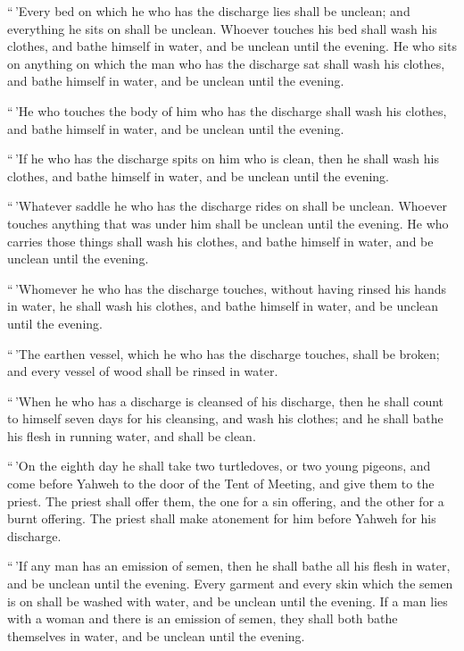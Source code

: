  ``\,'Every bed on which he who has the discharge lies
shall be unclean; and everything he sits on shall be unclean.
 Whoever touches his bed shall wash his clothes, and bathe
himself in water, and be unclean until the evening.  He
who sits on anything on which the man who has the discharge sat shall
wash his clothes, and bathe himself in water, and be unclean until the
evening.

 ``\,'He who touches the body of him who has the discharge
shall wash his clothes, and bathe himself in water, and be unclean until
the evening.

 ``\,'If he who has the discharge spits on him who is
clean, then he shall wash his clothes, and bathe himself in water, and
be unclean until the evening.

 ``\,'Whatever saddle he who has the discharge rides on
shall be unclean.  Whoever touches anything that was
under him shall be unclean until the evening. He who carries those
things shall wash his clothes, and bathe himself in water, and be
unclean until the evening.

 ``\,'Whomever he who has the discharge touches, without
having rinsed his hands in water, he shall wash his clothes, and bathe
himself in water, and be unclean until the evening.

 ``\,'The earthen vessel, which he who has the discharge
touches, shall be broken; and every vessel of wood shall be rinsed in
water.

 ``\,'When he who has a discharge is cleansed of his
discharge, then he shall count to himself seven days for his cleansing,
and wash his clothes; and he shall bathe his flesh in running water, and
shall be clean.

 ``\,'On the eighth day he shall take two turtledoves, or
two young pigeons, and come before Yahweh to the door of the Tent of
Meeting, and give them to the priest.  The priest shall
offer them, the one for a sin offering, and the other for a burnt
offering. The priest shall make atonement for him before Yahweh for his
discharge.

 ``\,'If any man has an emission of semen, then he shall
bathe all his flesh in water, and be unclean until the evening.
 Every garment and every skin which the semen is on shall
be washed with water, and be unclean until the evening. 
If a man lies with a woman and there is an emission of semen, they shall
both bathe themselves in water, and be unclean until the evening.

